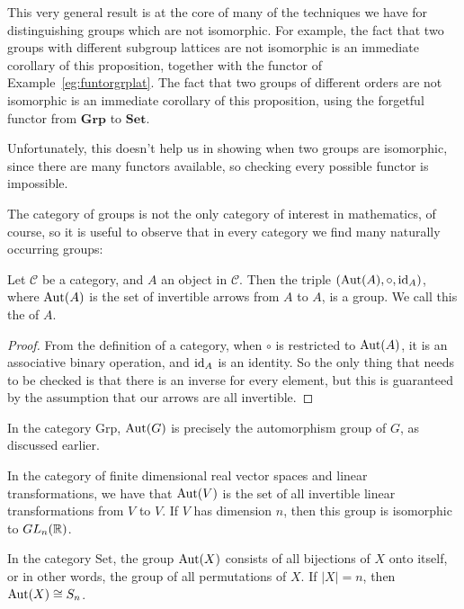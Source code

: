 This very general result is at the core of many of the techniques we have
for distinguishing groups which are not isomorphic.  For example, the fact
that two groups with different subgroup lattices are not isomorphic is an
immediate corollary of this proposition, together with the functor of
Example~\ref{eg:funtorgrplat}.  The fact that two groups of different orders
are not isomorphic is an immediate corollary of this proposition, using the
forgetful functor from $\mathbf{Grp}$ to $\mathbf{Set}$.

Unfortunately, this doesn't help us in showing when two groups are
isomorphic, since there are many functors available, so checking every
possible functor is impossible.

The category of groups is not the only category of interest in mathematics,
of course, so it is useful to observe that in every category we find many
naturally occurring groups:

\begin{proposition}
  Let $\mathcal{C}$ be a category, and $A$ an object in $\mathcal{C}$.  Then
  the triple $(\operatorname{Aut}(A), \circ, \text{id}_{A})$, where $\operatorname{Aut}(A)$ is the set of
  invertible arrows from $A$ to $A$, is a group.  We call this the
   of $A$.
\end{proposition}
\begin{proof}
  From the definition of a category, when $\circ$ is restricted to $\operatorname{Aut}(A)$,
  it is an associative binary operation, and $\text{id}_{A}$ is an identity.  So the
  only thing that needs to be checked is that there is an inverse for every
  element, but this is guaranteed by the assumption that our arrows are all
  invertible.
\end{proof}

\begin{example}
  In the category $\mathrm{Grp}$, $\operatorname{Aut}(G)$ is precisely the automorphism
  group of $G$, as discussed earlier.
\end{example}

\begin{example}
  In the category of finite dimensional real vector spaces and linear
  transformations, we have that $\operatorname{Aut}(V)$ is the set of all invertible
  linear transformations from $V$ to $V$.  If $V$ has dimension $n$, then
  this group is isomorphic to $GL_{n}(\mathbb{R})$.
\end{example}

\begin{example}
  In the category $\mathrm{Set}$, the group $\operatorname{Aut}(X)$ consists of all
  bijections of $X$ onto itself, or in other words, the group of all
  permutations of $X$.  If $|X| = n$, then $\operatorname{Aut}(X) \cong S_{n}$.
\end{example}

